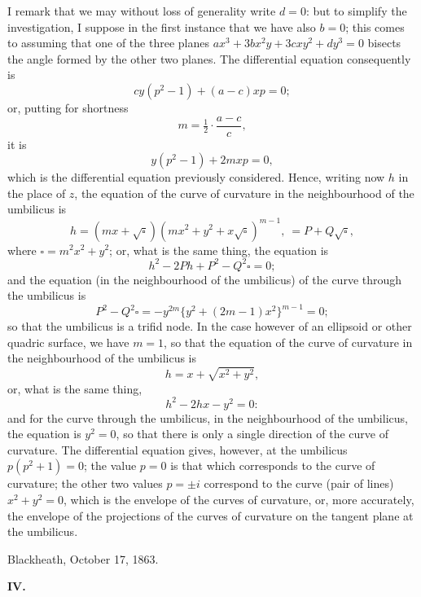 \documentclass[11pt,a4paper]{article}
\theoremstyle{plain}
\begin{document}
\newpage
I remark that we may without loss of generality write $d = 0$: but to simplify the investigation, I suppose in the first instance that we have also $b = 0$; this comes to assuming that one of the three planes $a x^3 + 3 b x^2 y + 3 c x y^2 + d y^3 = 0$ bisects the angle formed by the other two planes. The differential equation consequently is
\[
c y(p^2 - 1) + (a - c)x p = 0;
\]
or, putting for shortness
\[
m = \tfrac{1}{2}\cdot\frac{a - c}{c},
\]
it is
\[
y(p^2 - 1) + 2 m x p = 0,
\]
which is the differential equation previously considered. Hence, writing now $h$ in the place of $z$, the equation of the curve of curvature in the neighbourhood of the umbilicus is
\[
h = (m x + \sqrt{\square})(m x^2 + y^2 + x\sqrt{\square})^{m-1},\ = P + Q\sqrt{\square},
\]
where $\square = m^2 x^2 + y^2$; or, what is the same thing, the equation is
\[
h^2 - 2 P h + P^2 - Q^2 \square = 0;
\]
and the equation (in the neighbourhood of the umbilicus) of the curve through the umbilicus is
\[
P^2 - Q^2 \square = -y^{2m}\{y^2 + (2 m - 1) x^2\}^{m-1} = 0;
\]
so that the umbilicus is a trifid node. In the case however of an ellipsoid or other quadric surface, we have $m = 1$, so that the equation of the curve of curvature in the neighbourhood of the umbilicus is
\[
h = x + \sqrt{x^2 + y^2},
\]
or, what is the same thing,
\[
h^2 - 2 h x - y^2 = 0:
\]
and for the curve through the umbilicus, in the neighbourhood of the umbilicus, the equation is $y^2 = 0$, so that there is only a single direction of the curve of curvature. The differential equation gives, however, at the umbilicus $p(p^2 + 1) = 0$; the value $p = 0$ is that which corresponds to the curve of curvature; the other two values $p = \pm i$ correspond to the curve (pair of lines) $x^2 + y^2 = 0$, which is the envelope of the curves of curvature, or, more accurately, the envelope of the projections of the curves of curvature on the tangent plane at the umbilicus.

\medskip
\noindent Blackheath, October 17, 1863.

\begin{center}\textbf{IV.}\end{center}
\end{document}
